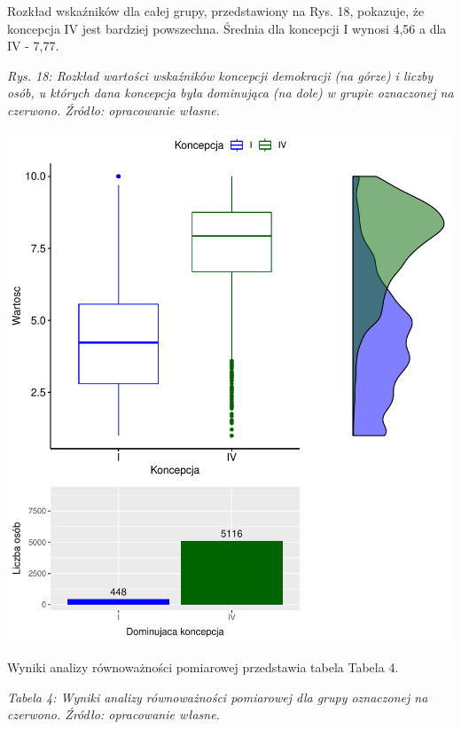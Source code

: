 \documentclass[12pt]{article}
\begin{document}
Rozkład wskaźników dla całej grupy, przedstawiony na Rys. 18, pokazuje, że koncepcja IV jest bardziej powszechna. Średnia dla koncepcji I wynosi 4,56 a dla IV - 7,77.

\emph{Rys. 18: Rozkład wartości wskaźników koncepcji demokracji (na górze) i liczby osób, u których dana koncepcja była dominująca (na dole) w grupie oznaczonej na czerwono. Źródło: opracowanie własne.}

\begin{center}\includegraphics{text_ASA_files/figure-latex/stats-gr-3-1} \end{center}

Wyniki analizy równoważności pomiarowej przedstawia tabela Tabela 4.

\emph{Tabela 4: Wyniki analizy równoważności pomiarowej dla grupy oznaczonej na czerwono. Źródło: opracowanie własne.}

\begin{table}[H]
\centering
{}
\end{table}
\end{document}

